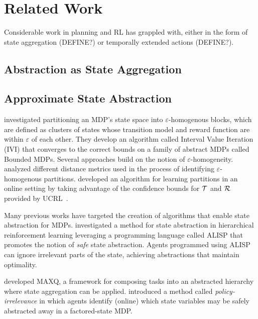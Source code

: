 \section{Related Work}

Considerable work in planning and \ac{RL} has grappled with, either in the form of state aggregation (DEFINE?) or temporally extended actions (DEFINE?).

\subsection{Abstraction as State Aggregation}

\subsection{Approximate State Abstraction}

\citet{dean1997model} investigated partitioning an \ac{MDP}'s state space into $\varepsilon$-homogenous blocks, which are defined as clusters of states whose transition model and reward function are within $\varepsilon$ of each other. They develop an algorithm called Interval Value Iteration (IVI) that converges to the correct bounds on a family of abstract MDPs called Bounded \acp{MDP}. Several approaches build on the notion of $\varepsilon$-homogeneity. \citet{even2003approximate} analyzed different distance metrics used in the process of identifying $\varepsilon$-homogenous partitions. \citet{ortner2013adaptive} developed an algorithm for learning partitions in an online setting by taking advantage of the confidence bounds for $\mathcal{T}$ and $\mathcal{R}$ provided by UCRL~\cite{auer2009near}.


Many previous works have targeted the creation of algorithms that enable state abstraction for MDPs. \citet{andre2002state} investigated a method for state abstraction in hierarchical reinforcement learning leveraging a programming language called ALISP that promotes the notion of {\it safe} state abstraction. Agents programmed using ALISP can ignore irrelevant parts of the state, achieving abstractions that maintain optimality. 

\citet{dietterich2000hierarchical} developed MAXQ, a framework for composing tasks into an abstracted hierarchy where state aggregation can be applied. \citet{jong2005state} introduced a method called {\it policy-irrelevance} in which agents identify (online) which state variables may be safely abstracted away in a factored-state \ac{MDP}. 

